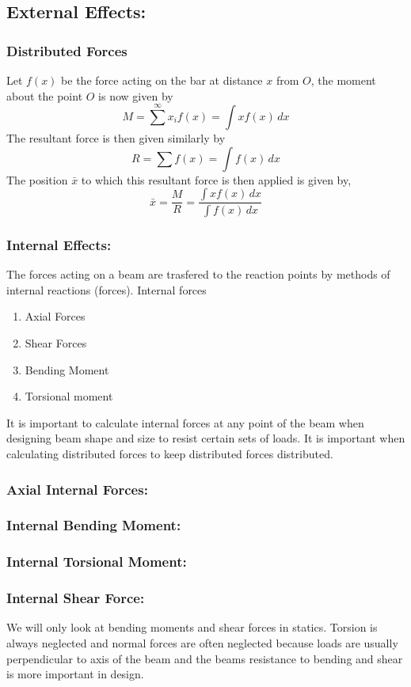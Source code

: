 \documentclass[14pt]{article}
\begin{document}
    \subsection{External Effects:}
    \subsubsection{Distributed Forces}
    Let $f(x)$ be the force acting on the bar at distance $x$ from $O$, the moment about the point $O$ is now given by
    $$M=\sum\limits^\infty x_i f(x)=\int x f(x)\, dx$$
    The resultant force is then given similarly by
    $$R=\sum f(x)=\int f(x)\, dx$$
    The position $\bar x$ to which this resultant force is then applied is given by,
    $$\bar x=\frac{M}{R}=\frac{\int x f(x)\, dx}{\int f(x)\, dx}$$
    \subsubsection{Internal Effects:}
    The forces acting on a beam are trasfered to the reaction points by methods of internal reactions (forces).
    Internal forces
    \begin{enumerate}
        \item Axial Forces
        \item Shear Forces
        \item Bending Moment
        \item Torsional moment
    \end{enumerate}
    It is important to calculate internal forces at any point of the beam when designing beam shape and size to resist certain sets of loads.
    It is important when calculating distributed forces to keep distributed forces distributed.
    \subsubsection{Axial Internal Forces:}
    \subsubsection{Internal Bending Moment:}
    \subsubsection{Internal Torsional Moment:}
    \subsubsection{Internal Shear Force:}
    We will only look at bending moments and shear forces in statics. Torsion is always neglected and normal forces are often neglected because loads are usually perpendicular to axis of the beam and the beams resistance to bending and shear is more important in design.
\end{document}

